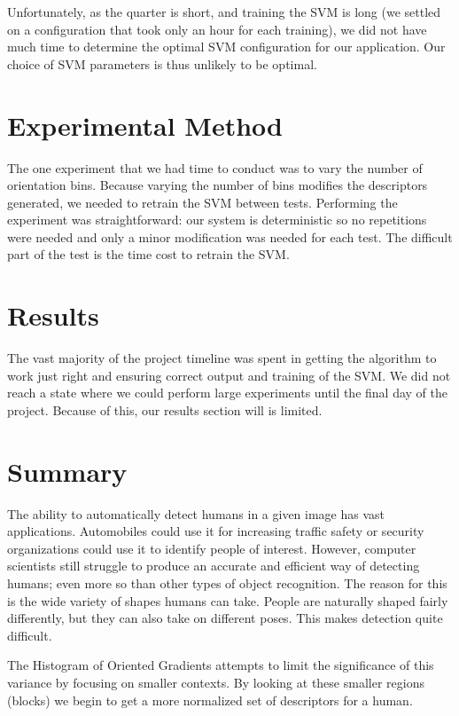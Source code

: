 \documentclass[a4paper,11pt]{article}
\begin{document}
\begin{multicols}{2}
Unfortunately, as the quarter is short, and training the SVM is long (we settled on 
a configuration that took only an hour for each training), we did not have 
much time to determine the optimal SVM configuration for our application.  
Our choice of SVM parameters is thus unlikely to be optimal.

\section{Experimental Method}
The one experiment that we had time to conduct was to vary the number of orientation bins.  
Because varying the number of bins modifies the descriptors generated, we needed to retrain 
the SVM between tests.  Performing the experiment was straightforward:  our system is deterministic 
so no repetitions were needed and only a minor modification was needed for each test.  The difficult 
part of the test is the time cost to retrain the SVM.

\section{Results}
The vast majority of the project timeline was spent in getting the algorithm to work just right 
and ensuring correct output and training of the SVM. We did not reach a state where we could 
perform large experiments until the final day of the project. Because of this, our results section will is limited.


\section{Summary}
The ability to automatically detect humans in a given image has vast applications. Automobiles could use 
it for increasing traffic safety or security organizations could use it to identify people of interest.
However, computer scientists still struggle to produce an accurate and efficient way of detecting humans; even
more so than other types of object recognition. The reason for this is the wide variety of shapes humans can take. 
People are naturally shaped fairly differently, but they can also take on different poses. This makes detection 
quite difficult.

The Histogram of Oriented Gradients attempts to limit the significance of this variance by focusing on smaller 
contexts. By looking at these smaller regions (blocks) we begin to get a more normalized set of descriptors for a human.


\end{multicols}
\end{document}
